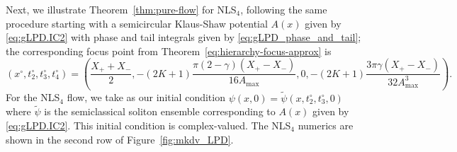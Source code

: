 \documentclass[12pt]{amsart}
\numberwithin{equation}{section}
\begin{document}
Next, we illustrate Theorem~\ref{thm:pure-flow} for NLS$_4$, following the same procedure starting with a semicircular Klaus-Shaw potential $A(x)$ given by \eqref{eq:gLPD.IC2} with phase and tail integrals given by \eqref{eq:gLPD_phase_and_tail}; 
the corresponding focus point from Theorem~\eqref{eq:hierarchy-focus-approx} is 
\begin{equation}
	(x^\circ, t_2^\circ, t_3^\circ, t_4^\circ) = 
	\left( \frac{X_+ + X_-}{2},  -(2K+1) \frac{\pi(2-\gamma)(X_+ - X_-)}{16 A_\mathrm{max}},  0, 
	-(2K+1)\frac{ 3\pi \gamma (X_+ - X_-)}{32A_\mathrm{max}^3}  \right).
\end{equation}
For the NLS$_4$ flow, we take as our initial condition $\psi(x,0) = \widetilde{\psi}(x,t_2^\circ, t_3^\circ, 0)$ where $\widetilde{\psi}$ is the semiclassical soliton ensemble corresponding to $A(x)$ given by \eqref{eq:gLPD.IC2}. This initial condition is complex-valued.  The NLS$_4$ numerics are shown in the second row of Figure~\ref{fig:mkdv_LPD}.
\end{document}
